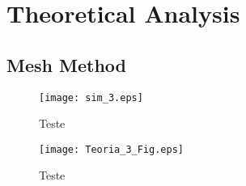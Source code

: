 \section{Theoretical Analysis}
\label{sec:analysis}

\subsection{Mesh Method}
\label{subsec:mesh}

\begin{figure}[!ht] 
\caption{Teste}
\texttt{[image: sim\_3.eps]}
\end{figure}


\begin{figure}[!ht]
\caption{Teste}
\texttt{[image: Teoria\_3\_Fig.eps]}
\end{figure}





